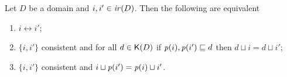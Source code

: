 \begin{lemma}
  \label{le:eq-char}
  Let $D$ be a domain and $i, i' \in \mathop{\mathit{ir}({D})}$.  Then the
  following are equivalent
  \begin{enumerate}
  \item 
    \label{le:eq-char:1}
    $i \leftrightarrow i'$;


  \item 
    \label{le:eq-char:3}
    $\{i, i'\}$ consistent and for all $d \in \mathop{\mathsf{K}({D})}$
    if $\mathit{p}({i}), \mathit{p}({i'}) \sqsubseteq d$ then
    $d \sqcup i = d \sqcup i'$;

  \item 
    \label{le:eq-char:4}
    $\{i, i'\}$ consistent and $i \sqcup \mathit{p}({i'}) = \mathit{p}({i}) \sqcup i'$.
  \end{enumerate}
\end{lemma}

